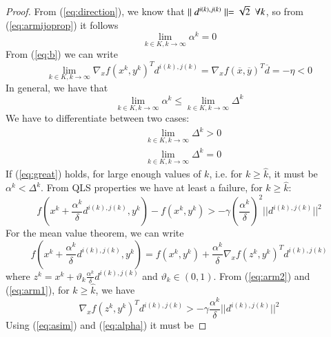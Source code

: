 \begin{proof}
From (\ref{eq:direction}), we know that $\parallel d^{i(k),j(k)} \parallel = \sqrt{2} \enskip\forall k$, so from (\ref{eq:armijoprop}) it follows
\begin{equation}\label{eq:alpha}%
\lim_{k \in K, k \rightarrow \infty} \alpha^{k}=0
\end{equation}
From (\ref{eq:b}) we can write
\begin{equation}\label{eq:wrong}
\lim_{k \in K, k \rightarrow \infty} \nabla_x f(x^k, y^k)^T d^{i(k),j(k)} = \nabla_x f(\overline{x},\overline{y})^T \overline{d} = -\eta < 0
\end{equation}
In general, we have that
\begin{equation}
\lim_{k \in K, k \rightarrow \infty} \alpha^k \leq \lim_{k \in K, k \rightarrow \infty} \Delta^k
\end{equation}
We have to differentiate between two cases:
\begin{subequations}
\begin{align}
& \lim_{k \in K, k \rightarrow \infty} \Delta^k > 0 \label{eq:great}\\
& \lim_{k \in K, k \rightarrow \infty} \Delta^k = 0 \label{eq:zero}
\end{align}
\end{subequations}
If (\ref{eq:great}) holds, for large enough values of $k$, i.e. for $k \geq \hat{k}$, it must be $\alpha^k < \Delta^k$. From QLS properties we have at least a failure, for $k \geq \hat{k}$:
\begin{equation}\label{eq:arm1}
f(x^k + \frac{\alpha^k}{\delta} d^{i(k),j(k)}, y^k) - f(x^k,y^k) > -\gamma \left(\frac{\alpha^k}{\delta}\right)^2 ||d^{i(k),j(k)}||^2
\end{equation}
For the mean value theorem, we can write
\begin{equation}\label{eq:arm2}
f(x^k + \frac{\alpha^k}{\delta} d^{i(k),j(k)}, y^k) = f(x^k, y^k) + \frac{\alpha^k}{\delta} \nabla_x f(z^k, y^k)^T d^{i(k),j(k)}
\end{equation}
where $z^k = x^k + \vartheta_k \frac{\alpha^k}{\delta} d^{i(k),j(k)}$ and $\vartheta_k \in (0,1)$. From (\ref{eq:arm2}) and (\ref{eq:arm1}), for $k \geq \hat{k}$, we have
\begin{equation}\label{eq:nabla}
\nabla_x f(z^k, y^k)^T d^{i(k),j(k)}  >- \gamma \frac{\alpha^k}{\delta} ||d^{i(k),j(k)}||^2
\end{equation}
Using (\ref{eq:asim}) and (\ref{eq:alpha}) it must be

\end{proof}

